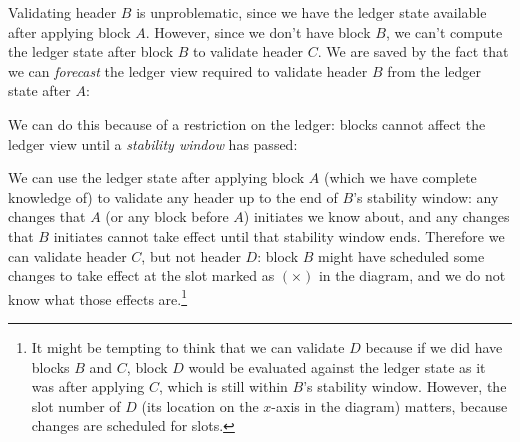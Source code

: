 %
Validating header $B$ is unproblematic, since we have the ledger state available
after applying block $A$. However, since we don't have block $B$, we can't
compute the ledger state after block $B$ to validate header $C$. We are saved by
the fact that we can \emph{forecast} the ledger view  required to validate
header $B$ from the ledger state after $A$:
%
\begin{center}
\end{center}
%
We can do this because of a restriction on the ledger: blocks cannot affect
the ledger view until a \emph{stability window} has passed:
%
\begin{center}
\end{center}
%
We can use the ledger state after applying block $A$ (which we
have complete knowledge of) to validate any header up to the end of $B$'s
stability window: any changes that $A$ (or any block before $A$)
initiates we know about, and any changes that $B$ initiates cannot take effect
until that stability window ends. Therefore we can validate header $C$, but not
header $D$: block $B$ might have scheduled some changes to take effect at the
slot marked as $(\times)$ in the diagram, and we do not know what those effects
are.\footnote{It might be tempting to think that we can validate $D$ because if
we did have blocks $B$ and $C$, block $D$ would be evaluated against the ledger
state as it was after applying $C$, which is still within $B$'s stability
window. However, the slot number of $D$ (its location on the $x$-axis in the
diagram) matters, because changes are scheduled for slots.}

